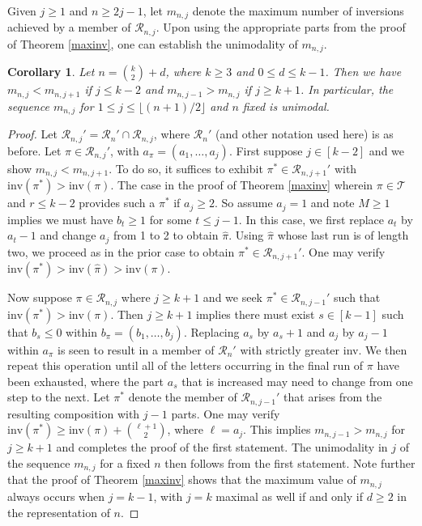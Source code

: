 \documentclass[11pt,a4paper]{article}
\newtheorem{corollary}{Corollary}[section]
\begin{document}
Given $j \geq 1$ and $n \geq 2j-1$, let $m_{n,j}$ denote the maximum number of inversions achieved by a member of $\mathcal{R}_{n,j}$.  Upon using the appropriate parts from the proof of Theorem \ref{maxinv}, one can establish the unimodality of $m_{n,j}$.

\begin{corollary}\label{unimod}
Let $n=\binom{k}{2}+d$, where $k \geq 3$ and $0 \leq d \leq k-1$.  Then we have $m_{n,j}<m_{n,j+1}$ if $j \leq k-2$ and $m_{n,j-1}>m_{n,j}$ if $j \geq k+1$.  In particular, the sequence $m_{n,j}$ for $1 \leq j \leq \lfloor (n+1)/2 \rfloor$ and $n$ fixed is unimodal.
\end{corollary}
\begin{proof}
Let $\mathcal{R}_{n,j}'=\mathcal{R}_n' \cap \mathcal{R}_{n,j}$, where $\mathcal{R}_n'$ (and other notation used here) is as before.  Let $\pi \in \mathcal{R}_{n,j}'$, with $a_\pi=(a_1,\ldots,a_j)$.  First suppose $j \in [k-2]$ and we show $m_{n,j}<m_{n,j+1}$.   To do so, it suffices to exhibit $\pi^* \in \mathcal{R}_{n,j+1}'$ with $\text{inv}(\pi^*)>\text{inv}(\pi)$.  The case in the proof of Theorem \ref{maxinv} wherein $\pi \in \mathcal{T}$ and $r \leq k-2$ provides such a $\pi^*$ if $a_j \geq 2$.  So assume $a_j=1$ and note $M\geq 1$ implies we must have  $b_t \geq 1$ for some $t \leq j-1$.  In this case, we first replace $a_t$ by $a_t-1$ and change $a_j$ from 1 to 2 to obtain $\widehat{\pi}$.  Using $\widehat{\pi}$ whose last run is of length two, we proceed as in the prior case to obtain $\pi^* \in \mathcal{R}_{n,j+1}'$.  One may verify $\text{inv}(\pi^*)>\text{inv}(\widehat{\pi})>\text{inv}(\pi)$.

Now suppose $\pi \in \mathcal{R}_{n,j}$ where $j \geq k+1$ and we seek $\pi^* \in \mathcal{R}_{n,j-1}'$ such that $\text{inv}(\pi^*)>\text{inv}(\pi)$.  Then $j \geq k+1$ implies there must exist $s \in [k-1]$ such that $b_s \leq 0$ within $b_\pi=(b_1,\ldots,b_j)$.  Replacing $a_s$ by $a_s+1$ and  $a_j$ by $a_j-1$ within $a_\pi$ is seen to result in a member of $\mathcal{R}_{n}'$ with strictly greater inv.  We then repeat this operation until all of the letters occurring in the final run of $\pi$ have been exhausted, where the part $a_s$ that is increased may need to change from one step to the next.  Let $\pi^*$ denote the member of $\mathcal{R}_{n,j-1}'$ that arises from the resulting composition with $j-1$ parts.  One may verify $\text{inv}(\pi^*) \geq \text{inv}(\pi)+\binom{\ell+1}{2}$, where $\ell=a_j$.  This implies $m_{n,j-1}>m_{n,j}$ for $j \geq k+1$ and completes the proof of the first statement.  The unimodality in $j$ of the sequence $m_{n,j}$ for a fixed $n$ then follows from the first statement.  Note further that the proof of Theorem \ref{maxinv} shows that the maximum value of $m_{n,j}$ always occurs when $j=k-1$, with $j=k$ maximal as well if and only if $ d\geq 2$ in the representation of $n$.
\end{proof}
\end{document}
